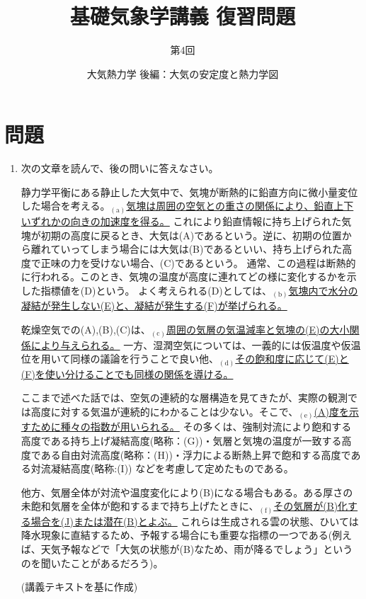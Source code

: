 \documentclass{jsarticle}
\newenvironment{problems}
{
  \renewcommand\labelenumi{\doublebox{\arabic{enumi}}}
  \begin{enumerate}
}{
  \end{enumerate}
  \renewcommand\labelenumi{\arabic{enumi}.}
}
\begin{document}
\title{基礎気象学講義 復習問題} %
\author{第4回} %
\date{大気熱力学 後編：大気の安定度と熱力学図} %
\maketitle

\section{問題}

    \begin{problems}
    \item 次の文章を読んで、後の問いに答えなさい。%
        \begin{screen}
          静力学平衡にある静止した大気中で、気塊が断熱的に鉛直方向に微小量変位した場合を考える。$_{(\mathrm{a})}$\underline{気塊は周囲の空気との重さの関係により、鉛直上下いずれかの向きの加速度を得る。}
          これにより鉛直情報に持ち上げられた気塊が初期の高度に戻るとき、大気は(A)であるという。逆に、初期の位置から離れていってしまう場合には大気は(B)であるといい、持ち上げられた高度で正味の力を受けない場合、(C)であるという。
          通常、この過程は断熱的に行われる。このとき、気塊の温度が高度に連れてどの様に変化するかを示した指標値を(D)という。
          よく考えられる(D)としては、$_{(\mathrm{b})}$\underline{気塊内で水分の凝結が発生しない(E)と、凝結が発生する(F)が挙げられる。}

          乾燥空気での(A),(B),(C)は、$_{(\mathrm{c})}$\underline{周囲の気層の気温減率と気塊の(E)の大小関係により与えられる。}
          一方、湿潤空気については、一義的には仮温度や仮温位を用いて同様の議論を行うことで良い他、$_{(\mathrm{d})}$\underline{その飽和度に応じて(E)と(F)を使い分けることでも同様の関係を導ける。}
          
          ここまで述べた話では、空気の連続的な層構造を見てきたが、実際の観測では高度に対する気温が連続的にわかることは少ない。そこで、$_{(\mathrm{e})}$\underline{(A)度を示すために種々の指数が用いられる。}
          その多くは、強制対流により飽和する高度である持ち上げ凝結高度(略称：(G))・気層と気塊の温度が一致する高度である自由対流高度(略称：(H))・浮力による断熱上昇で飽和する高度である対流凝結高度(略称:(I))
          などを考慮して定めたものである。

          他方、気層全体が対流や温度変化により(B)になる場合もある。ある厚さの未飽和気層を全体が飽和するまで持ち上げたときに、$_{(\mathrm{f})}$\underline{その気層が(B)化する場合を(J)または潜在(B)とよぶ。}
          これらは生成される雲の状態、ひいては降水現象に直結するため、予報する場合にも重要な指標の一つである(例えば、天気予報などで「大気の状態が(B)なため、雨が降るでしょう」というのを聞いたことがあるだろう)。
            \begin{flushright}
            (講義テキストを基に作成)
            \end{flushright}
        \end{screen}


\end{problems}
\end{document}
